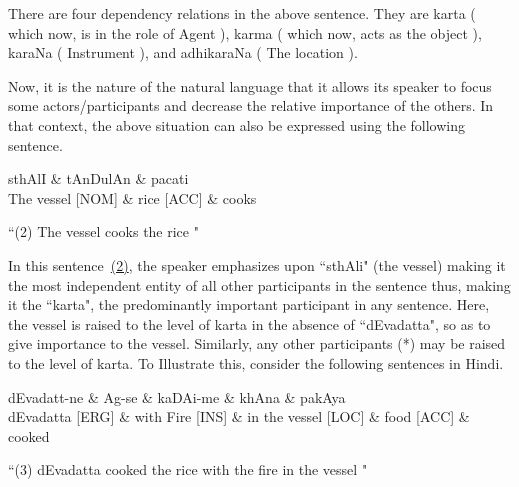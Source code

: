 \documentclass[twoside]{article}
\begin{document}
There are four dependency relations in the above sentence. They are karta ( which now, is in the role of Agent ), karma ( which now, acts as the object ), karaNa ( Instrument ), and adhikaraNa ( The location ).

Now, it is the nature of the natural language that it allows its speaker to focus some actors/participants and decrease the relative importance of the others. In that context, the above situation can also be expressed using the following sentence.

\hypertarget{fig2}{}
\begin{center}
\begin{dependency}[arc edge, arc angle=80, text only label, label style={above}]
   \begin{deptext}[column sep=1em]
      sthAlI \& tAnDulAn \& pacati \\
      The vessel [NOM] \& rice [ACC]  \& cooks \\
   \end{deptext}
   
\end{dependency} 

 ``(2) The vessel cooks the rice " 
\end{center}
In this sentence~\hyperlink{fig2}{(2)}, the speaker emphasizes upon ``sthAli" (the vessel) making it the most independent entity of all other participants in the sentence thus, making it the ``karta", the predominantly important participant in any sentence.
Here, the vessel is raised to the level of karta in the absence of ``dEvadatta", so as to give importance to the vessel.
Similarly, any other participants (*) may be raised to the level of karta.
To Illustrate this, consider the following sentences in Hindi.

\hypertarget{fig3}{}
\begin{center}
\begin{dependency}[arc edge, arc angle=80, text only label, label style={above}]
   \begin{deptext}[column sep=1em]
      dEvadatt-ne \& Ag-se \& kaDAi-me \& khAna \& pakAya \\
      dEvadatta [ERG] \& with Fire [INS] \& in the vessel [LOC] \& food [ACC]  \& cooked \\
   \end{deptext}
\end{dependency} 

 ``(3) dEvadatta cooked the rice with the fire in the vessel " 
 

\end{center}
\end{document}

